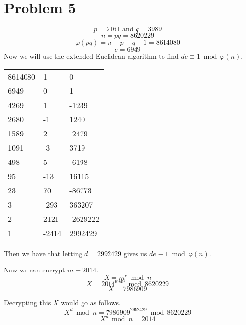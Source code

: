 \documentclass{article}
\begin{document}
\section*{Problem 5}
\[ p=2161 \text{ and } q=3989 \]
\[ n=pq=8620229 \]
\[ \varphi(pq) = n - p - q + 1  = 8614080 \]
\[ e = 6949 \]
Now we will use the extended Euclidean algorithm to find
$de \equiv 1 \bmod \varphi(n)$.

\begin{table}[h]
    \centering
    \begin{tabular}{ l l l }
        8614080 & 1 & 0 \\
        6949 & 0 & 1 \\
        4269 & 1 & -1239 \\
        2680 & -1 & 1240 \\
        1589 & 2 & -2479 \\
        1091 & -3 & 3719 \\
        498 & 5 & -6198 \\
        95 & -13 & 16115 \\
        23 & 70 & -86773 \\
        3 & -293 & 363207 \\
        2 & 2121 & -2629222 \\
        1 & -2414 & 2992429 \\
    \end{tabular}
\end{table}

Then we have that letting $d = 2992429$ gives us
$de \equiv 1 \bmod \varphi(n)$.

Now we can encrypt $m = 2014$.
\[ X =  m^e \bmod n \]
\[ X = 2014^{6949} \bmod 8620229 \]
\[ X = 7986909 \]

Decrypting this $X$ would go as follows.
\[ X^d \bmod n = 7986909^{2992429} \bmod 8620229 \]
\[ X^d \bmod n = 2014 \]
\end{document}
